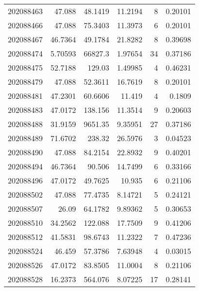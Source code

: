 \begin{tabular}{rrrrrr}
 202088463 &         47.088   &       48.1419 &           11.2194  &           8 & 0.20101 \\
 202088466 &         47.088   &       75.3403 &           11.3973  &           6 & 0.20101 \\
 202088467 &         46.7364  &       49.1784 &           21.8282  &           8 & 0.39698 \\
 202088474 &          5.70593 &    66827.3    &            1.97654 &          34 & 0.37186 \\
 202088475 &         52.7188  &      129.03   &            1.49985 &           4 & 0.46231 \\
 202088479 &         47.088   &       52.3611 &           16.7619  &           8 & 0.20101 \\
 202088481 &         47.2301  &       60.6606 &           11.419   &           4 & 0.1809  \\
 202088483 &         47.0172  &      138.156  &           11.3514  &           9 & 0.20603 \\
 202088488 &         31.9159  &     9651.35   &            9.35951 &          27 & 0.37186 \\
 202088489 &         71.6702  &      238.32   &           26.5976  &           3 & 0.04523 \\
 202088490 &         47.088   &       84.2154 &           22.8932  &           9 & 0.40201 \\
 202088494 &         46.7364  &       90.506  &           14.7499  &           6 & 0.33166 \\
 202088496 &         47.0172  &       49.7625 &           10.935   &           6 & 0.21106 \\
 202088502 &         47.088   &       77.4735 &            8.14721 &           5 & 0.24121 \\
 202088507 &         26.09    &       64.1782 &            9.89362 &           5 & 0.30653 \\
 202088510 &         34.2562  &      122.088  &           17.7509  &           9 & 0.41206 \\
 202088512 &         41.5831  &       98.6743 &           11.2322  &           7 & 0.47236 \\
 202088524 &         46.459   &       57.3786 &            7.63948 &           4 & 0.03015 \\
 202088526 &         47.0172  &       83.8505 &           11.0004  &           8 & 0.21106 \\
 202088528 &         16.2373  &      564.076  &            8.07225 &          17 & 0.28141 \\

\end{tabular}
